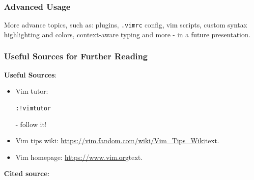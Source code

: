 \documentclass{beamer}
\newcommand{\thl}[1]{
	\texttt{#1}
}
\newcommand{\tcmd}[1]{
	\thl{:#1}
}
\begin{document}
\begin{frame}
	\frametitle{Advanced Usage}
	More advance topics, such as: plugins, \thl{.vimrc} config, vim scripts, custom syntax highlighting and colors, context-aware typing and more - in a future presentation.
\end{frame}

\begin{frame}
	\frametitle{Useful Sources for Further Reading}
	\textbf{Useful Sources}:
	\begin{itemize}
		\item Vim tutor: \tcmd{!vimtutor} - follow it!
		\item Vim tips wiki: \url{https://vim.fandom.com/wiki/Vim_Tips_Wiki}{text}.
		\item Vim homepage: \url{https://www.vim.org}{text}.
	\end{itemize}

	\textbf{Cited source}:

	\printbibliography
\end{frame}
\end{document}
